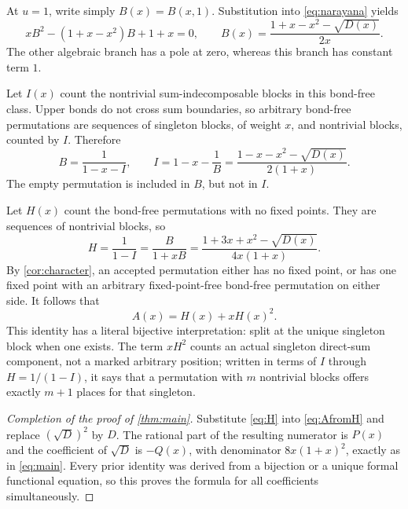 \documentclass[11pt,letterpaper]{article}
\numberwithin{equation}{section}
\theoremstyle{definition}
\begin{document}
At $u=1$, write simply $B(x)=B(x,1)$. Substitution into
\eqref{eq:narayana} yields
\begin{equation}
 xB^2-(1+x-x^2)B+1+x=0,
 \qquad
 B(x)=\frac{1+x-x^2-\sqrt{D(x)}}{2x}.
 \label{eq:B}
\end{equation}
The other algebraic branch has a pole at zero, whereas this branch has
constant term $1$.

Let $I(x)$ count the nontrivial sum-indecomposable blocks in this
bond-free class. Upper bonds do not cross sum boundaries, so arbitrary
bond-free permutations are sequences of singleton blocks, of weight $x$,
and nontrivial blocks, counted by $I$. Therefore
\begin{equation}
 B=\frac1{1-x-I},\qquad
 I=1-x-\frac1B
   =\frac{1-x-x^2-\sqrt{D(x)}}{2(1+x)}.
 \label{eq:I}
\end{equation}
The empty permutation is included in $B$, but not in $I$.

Let $H(x)$ count the bond-free permutations with no fixed points. They
are sequences of nontrivial blocks, so
\begin{equation}
 H=\frac1{1-I}=\frac{B}{1+xB}
   =\frac{1+3x+x^2-\sqrt{D(x)}}{4x(1+x)}.
 \label{eq:H}
\end{equation}
By \cref{cor:character}, an accepted permutation either has no fixed
point, or has one fixed point with an arbitrary fixed-point-free
bond-free permutation on either side. It follows that
\begin{equation}
 \boxed{A(x)=H(x)+xH(x)^2.}
 \label{eq:AfromH}
\end{equation}
This identity has a literal bijective interpretation: split at the
unique singleton block when one exists. The term $xH^2$ counts an actual
singleton direct-sum component, not a marked arbitrary position; written
in terms of $I$ through $H=1/(1-I)$, it says that a permutation with $m$
nontrivial blocks offers exactly $m+1$ places for that singleton.

\begin{proof}[Completion of the proof of \cref{thm:main}]
Substitute \eqref{eq:H} into \eqref{eq:AfromH} and replace
$(\sqrt{D})^2$ by $D$. The rational part of the resulting numerator is
$P(x)$ and the coefficient of $\sqrt{D}$ is $-Q(x)$, with denominator
$8x(1+x)^2$, exactly as in \eqref{eq:main}. Every prior identity was
derived from a bijection or a unique formal functional equation, so
this proves the formula for all coefficients simultaneously.
\end{proof}
\end{document}
